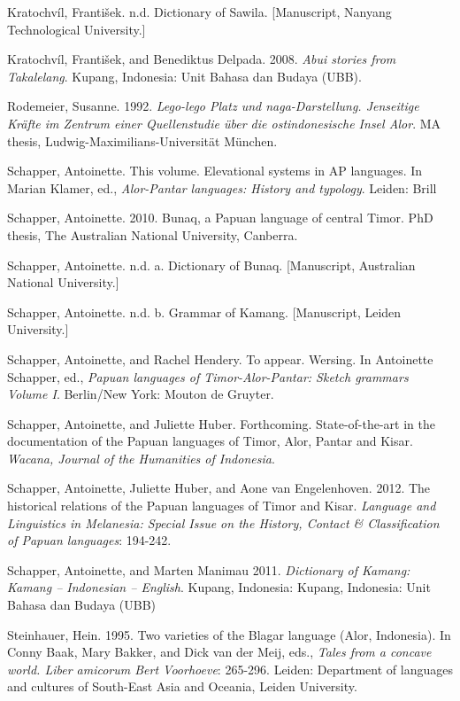 Kratochv\'il, Franti\v{s}ek. n.d. Dictionary of Sawila. [Manuscript, Nanyang Technological University.]

Kratochv\'il, Franti\v{s}ek, and Benediktus Delpada. 2008. \textit{Abui stories from Takalelang}. Kupang, Indonesia: Unit Bahasa dan Budaya (UBB).

Rodemeier, Susanne. 1992. \textit{Lego-lego Platz und naga-Darstellung. Jenseitige Kr\"afte im Zentrum einer Quellenstudie \"uber die ostindonesische Insel Alor}. MA thesis, Ludwig-Maximilians-Universit\"at M\"unchen.

Schapper, Antoinette. This volume. Elevational systems in AP languages. In Marian Klamer, ed., \textit{Alor-Pantar languages: History and typology}. Leiden: Brill

Schapper, Antoinette. 2010. Bunaq, a Papuan language of central Timor. PhD thesis, The Australian National University, Canberra.

Schapper, Antoinette. n.d. a. Dictionary of Bunaq. [Manuscript, Australian National University.]

Schapper, Antoinette. n.d. b. Grammar of Kamang. [Manuscript, Leiden University.]

Schapper, Antoinette, and Rachel Hendery. To appear. Wersing. In Antoinette Schapper, ed., \textit{Papuan languages of Timor-Alor-Pantar: Sketch grammars Volume I}. Berlin/New York: Mouton de Gruyter.

Schapper, Antoinette, and Juliette Huber. Forthcoming. State-of-the-art in the documentation of the Papuan languages of Timor, Alor, Pantar and Kisar. \textit{Wacana, Journal of the Humanities of Indonesia}. 

Schapper, Antoinette, Juliette Huber, and Aone van Engelenhoven. 2012. The historical relations of the Papuan languages of Timor and Kisar. \textit{Language and Linguistics in Melanesia: Special Issue on the History, Contact \& Classification of Papuan languages}: 194-242.

Schapper, Antoinette, and Marten Manimau 2011. \textit{Dictionary of Kamang: Kamang -- Indonesian -- English}. Kupang, Indonesia: Kupang, Indonesia: Unit Bahasa dan Budaya (UBB) 

Steinhauer, Hein. 1995. Two varieties of the Blagar language (Alor, Indonesia). In Conny Baak, Mary Bakker, and Dick van der Meij, eds., \textit{Tales from a concave world. Liber amicorum Bert Voorhoeve}: 265-296. Leiden: Department of languages and cultures of South-East Asia and Oceania, Leiden University.

